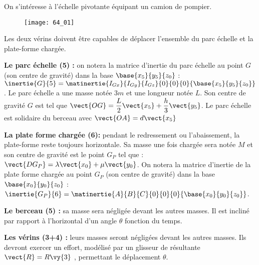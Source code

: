 \normaltrue \difficilefalse \tdifficilefalse
\correctionfalse


\setcounter{question}{0}
\ifcorrection
\else
{}
\fi

\ifprof
\else


On s'intéresse à l'échelle pivotante équipant un camion de pompier.

\begin{figure}[H]
\centering
\texttt{[image: 64\_01]}
\end{figure}

Les deux vérins doivent être capables de déplacer l’ensemble du parc échelle et la plate-forme
chargée.

\textbf{Le parc échelle (5) :} 
on notera la matrice d’inertie du parc échelle au point $G$ (son centre de gravité) dans la base 
$\base{x_5}{y_5}{z_0}$ : $\inertie{G}{5} = \matinertie{I_{Gx}}{I_{Gy}}{I_{Gz}}{0}{0}{0}{\base{x_5}{y_5}{z_0}}$. Le parc échelle a une masse notée $3m$ et une longueur notée $L$. Son centre de gravité $G$ est tel que $\vect{OG}=\dfrac{L}{2}\vect{x_5}+\dfrac{h}{3}\vect{y_5}$. 
Le parc échelle est solidaire du berceau avec $\vect{OA}=d\vect{x_5}$

\textbf{La plate forme chargée (6):} pendant le redressement ou l’abaissement, la plate-forme reste toujours horizontale.
Sa masse une fois chargée sera notée $M$ et son centre de gravité est le point $G_P$ tel que : 
$\vect{DG_P}=\lambda \vect{x_0} + \mu\vect{y_0}$.
On notera la matrice d’inertie de la plate forme chargée au point $G_P$ (son centre de gravité) dans la base 
$\base{x_0}{y_0}{z_0}$ : $\inertie{G_P}{6} = \matinertie{A}{B}{C}{0}{0}{0}{\base{x_0}{y_0}{z_0}}$.

\textbf{Le berceau (5) :} sa masse sera négligée devant les autres masses. Il est incliné par rapport à l’horizontal d’un angle $\theta$ fonction du temps.

\textbf{Les vérins (3+4) :} leurs masses seront négligées devant les autres masses.
Ils devront exercer un effort, modélisé par un glisseur de résultante $\vect{R}=R\vy{3}$ , permettant le
déplacement $\theta$.
\fi

\ifprof
\else
\fi

